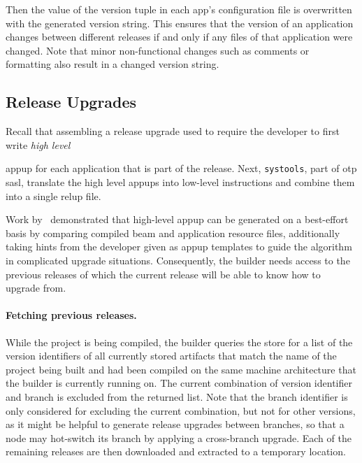 Then the value of the version tuple in each app's configuration file is overwritten with the generated version string. This ensures that the version of an application changes between different releases if and only if any files of that application were changed. Note that minor non-functional changes such as comments or formatting also result in a changed version string.

\subsection{Release Upgrades}

Recall that assembling a release upgrade used to require the developer to first write \emph{high level} {\acrfull{appup} for each application that is part of the release. Next, \lstinline|systools|, part of \acrshort{otp} \acrfull{sasl}, translate the high level appups into low-level instructions and combine them into a single \acrfull{relup} file.~\cite{doc:otp}

Work by~\cite{rebar3appup} demonstrated that high-level \acrlong{appup} can be generated on a best-effort basis by comparing compiled \acrshort{beam} and application resource files, additionally taking hints from the developer given as appup templates to guide the algorithm in complicated upgrade situations. Consequently, the builder needs access to the previous releases of which the current release will be able to know how to upgrade from.

\paragraph{Fetching previous releases.} While the project is being compiled, the builder queries the store for a list of the version identifiers of all currently stored artifacts that match the name of the project being built and had been compiled on the same machine architecture that the builder is currently running on. The current combination of version identifier and branch is excluded from the returned list. Note that the branch identifier is only considered for excluding the current combination, but not for other versions, as it might be helpful to generate release upgrades between branches, so that a node may hot-switch its branch by applying a cross-branch upgrade. Each of the remaining releases are then downloaded and extracted to a temporary location.

}
